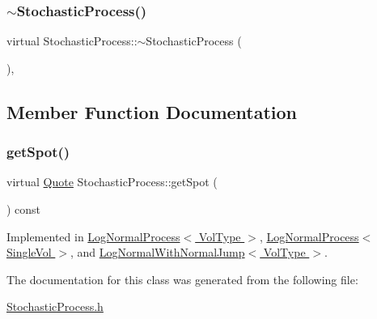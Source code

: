 \subsubsection{\texorpdfstring{$\sim$\+Stochastic\+Process()}{~StochasticProcess()}}
{\footnotesize\ttfamily virtual Stochastic\+Process\+::$\sim$\+Stochastic\+Process (\begin{DoxyParamCaption}{ }\end{DoxyParamCaption})\hspace{0.3cm}{\ttfamily [inline]}, {\ttfamily [virtual]}}



\subsection{Member Function Documentation}
\hypertarget{class_stochastic_process_aad2ef51ca4bc2fe5f33a73e8f0ee361e}{}\label{class_stochastic_process_aad2ef51ca4bc2fe5f33a73e8f0ee361e} 
\subsubsection{\texorpdfstring{get\+Spot()}{getSpot()}}
{\footnotesize\ttfamily virtual \hyperlink{_name_def_8h_a642a6c5fd87319d922637de0e0bb0305}{Quote} Stochastic\+Process\+::get\+Spot (\begin{DoxyParamCaption}{ }\end{DoxyParamCaption}) const\hspace{0.3cm}{\ttfamily [pure virtual]}}



Implemented in \hyperlink{class_log_normal_process_a2c01b829c59e9b6156f0e34b3632c800}{Log\+Normal\+Process$<$ Vol\+Type $>$}, \hyperlink{class_log_normal_process_a2c01b829c59e9b6156f0e34b3632c800}{Log\+Normal\+Process$<$ Single\+Vol $>$}, and \hyperlink{class_log_normal_with_normal_jump_a7a6cd6409ac252d9c68ecbc36e135fb5}{Log\+Normal\+With\+Normal\+Jump$<$ Vol\+Type $>$}.



The documentation for this class was generated from the following file\+:\begin{DoxyCompactItemize}
\item 
\hyperlink{_stochastic_process_8h}{Stochastic\+Process.\+h}\end{DoxyCompactItemize}
